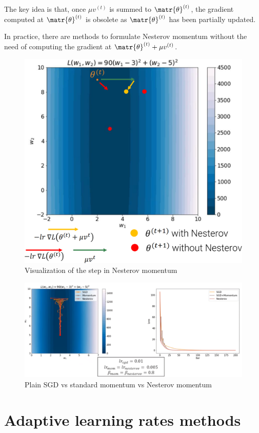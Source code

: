 \begin{description}
        \begin{remark}
            The key idea is that, once $\mu v^{(t)}$ is summed to $\matr{\theta}^{(t)}$, the gradient computed at $\matr{\theta}^{(t)}$ is obsolete as $\matr{\theta}^{(t)}$ has been partially updated.
        \end{remark}

        \begin{remark}
            In practice, there are methods to formulate Nesterov momentum without the need of computing the gradient at $\matr{\theta}^{(t)} + \mu v^{(t)}$.
        \end{remark}

        \begin{figure}[H]
            \centering
            \includegraphics[width=0.35\linewidth]{./img/nesterov_momentum.png}
            \caption{Visualization of the step in Nesterov momentum}
        \end{figure}

        \begin{figure}[H]
            \centering
            \includegraphics[width=0.75\linewidth]{./img/nesterov_comparison.png}
            \caption{Plain SGD vs standard momentum vs Nesterov momentum}
        \end{figure}
\end{description}



\section{Adaptive learning rates methods}

